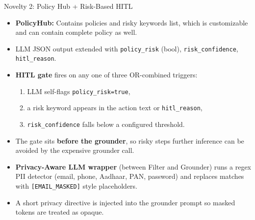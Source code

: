 \begin{frame}{Novelty 2: Policy Hub + Risk-Based HITL}
  \footnotesize
  \begin{itemize}
    \item \textbf{PolicyHub:} Contains policies and risky keywords list, which is customizable and can contain complete policy as well.

    \item LLM JSON output extended with \texttt{policy\_risk} (bool), \texttt{risk\_confidence}, \texttt{hitl\_reason}.

    \item \textbf{HITL gate} fires on any one of three OR-combined triggers:
    \begin{enumerate}
      \item[(a)] LLM self-flags \texttt{policy\_risk=true},
      \item[(b)] a risk keyword appears in the action text or \texttt{hitl\_reason},
      \item[(c)] \texttt{risk\_confidence} falls below a configured threshold.
    \end{enumerate}

    \item The gate sits \textbf{before the grounder}, so risky steps further inference can be avoided by the expensive grounder call.

    \item \textbf{Privacy-Aware LLM wrapper} (between Filter and Grounder) runs a regex PII detector (email, phone, Aadhaar, PAN, password) and replaces matches with \texttt{[EMAIL\_MASKED]} style placeholders.
    \item A short privacy directive is injected into the grounder prompt so masked tokens are treated as opaque.
  \end{itemize}
\end{frame}
